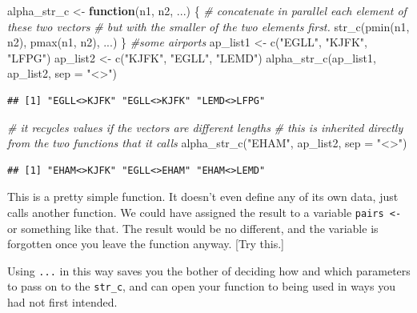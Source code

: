 \documentclass[
]{book}
\newenvironment{Shaded}{\begin{snugshade}}{\end{snugshade}}
\newcommand{\AttributeTok}[1]{\textcolor[rgb]{0.77,0.63,0.00}{#1}}
\newcommand{\CommentTok}[1]{\textcolor[rgb]{0.56,0.35,0.01}{\textit{#1}}}
\newcommand{\ControlFlowTok}[1]{\textcolor[rgb]{0.13,0.29,0.53}{\textbf{#1}}}
\newcommand{\FunctionTok}[1]{\textcolor[rgb]{0.00,0.00,0.00}{#1}}
\newcommand{\NormalTok}[1]{#1}
\newcommand{\OtherTok}[1]{\textcolor[rgb]{0.56,0.35,0.01}{#1}}
\newcommand{\StringTok}[1]{\textcolor[rgb]{0.31,0.60,0.02}{#1}}
\begin{document}
\begin{Shaded}
\begin{Highlighting}[]
\NormalTok{alpha\_str\_c }\OtherTok{\textless{}{-}} \ControlFlowTok{function}\NormalTok{(n1, n2, ...) \{}
  \CommentTok{\# concatenate in parallel each element of these two vectors}
  \CommentTok{\# but with the smaller of the two elements first.}
  \FunctionTok{str\_c}\NormalTok{(}\FunctionTok{pmin}\NormalTok{(n1, n2), }\FunctionTok{pmax}\NormalTok{(n1, n2), ...)}
\NormalTok{\}}
\CommentTok{\#some airports}
\NormalTok{ap\_list1 }\OtherTok{\textless{}{-}} \FunctionTok{c}\NormalTok{(}\StringTok{"EGLL"}\NormalTok{, }\StringTok{"KJFK"}\NormalTok{, }\StringTok{"LFPG"}\NormalTok{)}
\NormalTok{ap\_list2 }\OtherTok{\textless{}{-}} \FunctionTok{c}\NormalTok{(}\StringTok{"KJFK"}\NormalTok{, }\StringTok{"EGLL"}\NormalTok{, }\StringTok{"LEMD"}\NormalTok{)}
\FunctionTok{alpha\_str\_c}\NormalTok{(ap\_list1, ap\_list2, }\AttributeTok{sep =} \StringTok{"\textless{}\textgreater{}"}\NormalTok{)}
\end{Highlighting}
\end{Shaded}

\begin{verbatim}
## [1] "EGLL<>KJFK" "EGLL<>KJFK" "LEMD<>LFPG"
\end{verbatim}

\begin{Shaded}
\begin{Highlighting}[]
\CommentTok{\# it recycles values if the vectors are different lengths}
\CommentTok{\# this is inherited directly from the two functions that it calls}
\FunctionTok{alpha\_str\_c}\NormalTok{(}\StringTok{"EHAM"}\NormalTok{, ap\_list2, }\AttributeTok{sep =} \StringTok{"\textless{}\textgreater{}"}\NormalTok{)}
\end{Highlighting}
\end{Shaded}

\begin{verbatim}
## [1] "EHAM<>KJFK" "EGLL<>EHAM" "EHAM<>LEMD"
\end{verbatim}

This is a pretty simple function. It doesn't even define any of its own data, just calls another function. We could have assigned the result to a variable \texttt{pairs\ \textless{}-} or something like that. The result would be no different, and the variable is forgotten once you leave the function anyway. {[}Try this.{]}

Using \texttt{...} in this way saves you the bother of deciding how and which parameters to pass on to the \texttt{str\_c}, and can open your function to being used in ways you had not first intended.
\end{document}
